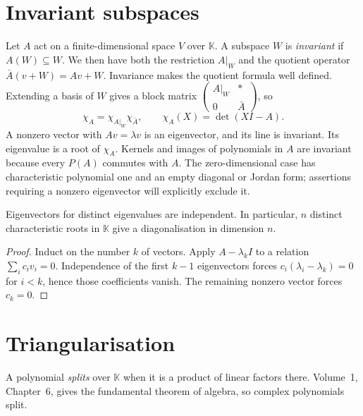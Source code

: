 \section{Invariant subspaces}

Let $A$ act on a finite-dimensional space $V$ over $\mathbb K$. A subspace $W$ is \emph{invariant} if $A(W)\subseteq W$. We then have both the restriction $A|_W$ and the quotient operator $\bar A(v+W)=Av+W$. Invariance makes the quotient formula well defined. Extending a basis of $W$ gives a block matrix $\begin{pmatrix}A|_W&*\\0&\bar A\end{pmatrix}$, so
\begin{equation}\label{linear:eq:charfactor}
\chi_A=\chi_{A|_W}\chi_{\bar A},\qquad\chi_A(X)=\det(XI-A).
\end{equation}
A nonzero vector with $Av=\lambda v$ is an eigenvector, and its line is invariant. Its eigenvalue is a root of $\chi_A$. Kernels and images of polynomials in $A$ are invariant because every $P(A)$ commutes with $A$. The zero-dimensional case has characteristic polynomial one and an empty diagonal or Jordan form; assertions requiring a nonzero eigenvector will explicitly exclude it.

\begin{proposition}\label{linear:prop:indep}
Eigenvectors for distinct eigenvalues are independent. In particular, $n$ distinct characteristic roots in $\mathbb K$ give a diagonalisation in dimension $n$.
\end{proposition}
\begin{proof}
Induct on the number $k$ of vectors. Apply $A-\lambda_k I$ to a relation $\sum_ic_iv_i=0$. Independence of the first $k-1$ eigenvectors forces $c_i(\lambda_i-\lambda_k)=0$ for $i<k$, hence those coefficients vanish. The remaining nonzero vector forces $c_k=0$.
\end{proof}

\section{Triangularisation}

A polynomial \emph{splits} over $\mathbb K$ when it is a product of linear factors there. Volume~1, Chapter~6, gives the fundamental theorem of algebra, so complex polynomials split.

